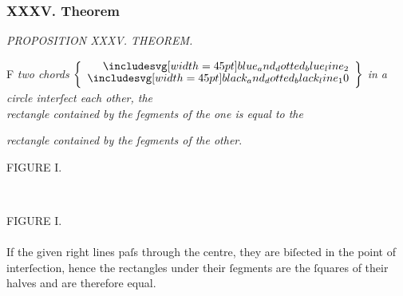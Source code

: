 \documentclass[11pt,preview]{standalone}
\begin{document}
\subsubsection{XXXV. Theorem}

\hfill

\begin{minipage}[t]{\textwidth}
    \begin{center}
        \textit{PROPOSITION XXXV. THEOREM.}\label{book3pr35} \\
    \end{center}

    \hfill

    \begin{center}
        \raggedright \lettrine[lines=3, loversize=1, nindent=0pt]{}{}F \textit{two chords} $\left\{\begin{aligned}\bimg{blue_and_dotted_blue_line_2} \\[-2ex] \bimg{black_and_dotted_black_line_10} \end{aligned}\right\}$ \textit{in a circle interſect each other, the\\ rectangle contained by the ſegments of the one is equal to the}
    \end{center}
    \vspace{1ex}
    \textit{rectangle contained by the ſegments of the other}.
\end{minipage}%

\hfill

\hfill

\begin{minipage}[t]{0.43\textwidth}
    \vspace{0pt}
    \begin{center}
        FIGURE I.
    \end{center}
    \hfill\\
    
\end{minipage}%
\hfill
\begin{minipage}[t]{0.54\textwidth}
    \vspace{0pt}

    \begin{center}
        FIGURE I.\\
        \hfill\\
        If the given right lines paſs through the centre, they are biſected in the point of interſection, hence the rectangles under their ſegments are the ſquares of their halves and are therefore equal.
    \end{center}
\end{minipage}%
\end{document}
